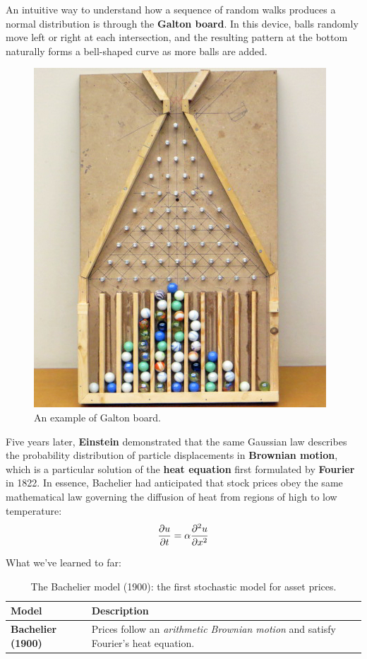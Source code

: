 An intuitive way to understand how a sequence of random walks produces a normal distribution is through the \textbf{Galton board}. In this device, balls randomly move left or right at each intersection, and the resulting pattern at the bottom naturally forms a bell-shaped curve as more balls are added.
\begin{figure} [H]
\centering
\includegraphics[width=0.5\linewidth]{img/Galton_Board_5.jpeg}
\caption{An example of Galton board.}
\end{figure}

Five years later, \textbf{Einstein} demonstrated that the same Gaussian law describes the probability distribution of particle displacements in \textbf{Brownian motion}, which is a particular solution of the \textbf{heat equation} first formulated by \textbf{Fourier} in 1822. In essence, Bachelier had anticipated that stock prices obey the same mathematical law governing the diffusion of heat from regions of high to low temperature:
\begin{equation}\label{eq:heat}
    \pdv{u}{t} = \alpha \pdv[2]{u}{x}
\end{equation} 

What we've learned to far:

\begin{table}[H]
\centering
{}
\begin{tabular}{@{}p{4cm}p{8.5cm}@{}}
\toprule
\rowcolor{gray!15}
\textbf{Model} & \textbf{Description} \\ \midrule
\textbf{Bachelier (1900)} &
Prices follow an \emph{arithmetic Brownian motion} and satisfy Fourier's heat equation. \\
\bottomrule
\end{tabular}
\caption{The Bachelier model (1900): the first stochastic model for asset prices.}
\end{table}



